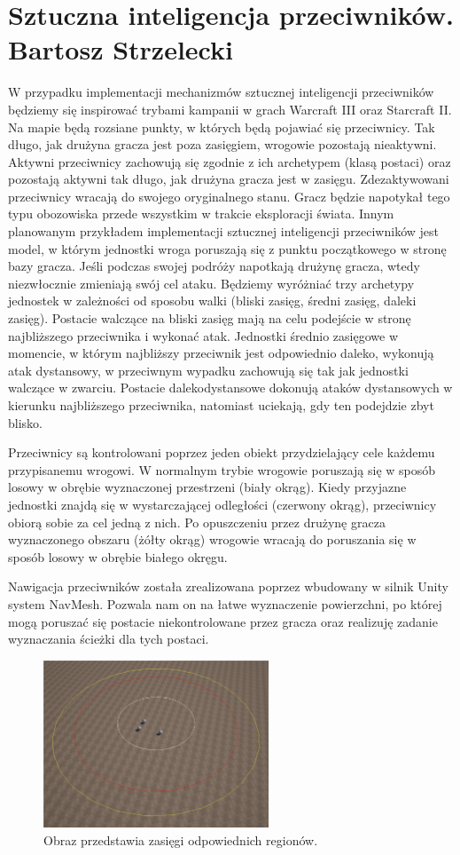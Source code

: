 \section{Sztuczna inteligencja przeciwników. Bartosz Strzelecki}

W przypadku implementacji mechanizmów sztucznej inteligencji przeciwników będziemy się inspirować trybami kampanii w grach Warcraft III oraz Starcraft II. 
Na mapie będą rozsiane punkty, w których będą pojawiać się przeciwnicy. 
Tak długo, jak drużyna gracza jest poza zasięgiem, wrogowie pozostają nieaktywni. 
Aktywni przeciwnicy zachowują się zgodnie z ich archetypem (klasą postaci) oraz pozostają aktywni tak długo, jak drużyna gracza jest w zasięgu. 
Zdezaktywowani przeciwnicy wracają do swojego oryginalnego stanu. Gracz będzie napotykał tego typu obozowiska przede wszystkim w trakcie eksploracji świata. 
Innym planowanym przykładem implementacji sztucznej inteligencji przeciwników jest model, w którym jednostki wroga poruszają się z punktu początkowego w stronę bazy gracza. 
Jeśli podczas swojej podróży napotkają drużynę gracza, wtedy niezwłocznie zmieniają swój cel ataku.
Będziemy wyróżniać trzy archetypy jednostek w zależności od sposobu walki (bliski zasięg, średni zasięg, daleki zasięg). 
Postacie walczące na bliski zasięg mają na celu podejście w stronę najbliższego przeciwnika i wykonać atak. 
Jednostki średnio zasięgowe w momencie, w którym najbliższy przeciwnik jest odpowiednio daleko, wykonują atak dystansowy, 
w przeciwnym wypadku zachowują się tak jak jednostki walczące w zwarciu. 
Postacie  dalekodystansowe dokonują ataków dystansowych w kierunku najbliższego przeciwnika, natomiast uciekają, gdy ten podejdzie zbyt blisko.

Przeciwnicy są kontrolowani poprzez jeden obiekt przydzielający cele każdemu przypisanemu wrogowi. W normalnym trybie wrogowie poruszają się w sposób losowy
w obrębie wyznaczonej przestrzeni (biały okrąg). Kiedy przyjazne jednostki znajdą się w wystarczającej odległości (czerwony okrąg), przeciwnicy obiorą sobie za cel jedną z nich.
Po opuszczeniu przez drużynę gracza wyznaczonego obszaru (żółty okrąg) wrogowie wracają do poruszania się w sposób losowy w obrębie białego okręgu.

Nawigacja przeciwników została zrealizowana poprzez wbudowany w silnik Unity system NavMesh. Pozwala nam on na łatwe wyznaczenie powierzchni, po której mogą poruszać
się postacie niekontrolowane przez gracza oraz realizuję zadanie wyznaczania ścieżki dla tych postaci.

\begin{figure}[h]
\centering
\includegraphics[width=0.6\textwidth]{images/ai}
\caption{Obraz przedstawia zasięgi odpowiednich regionów.}
\end{figure}
